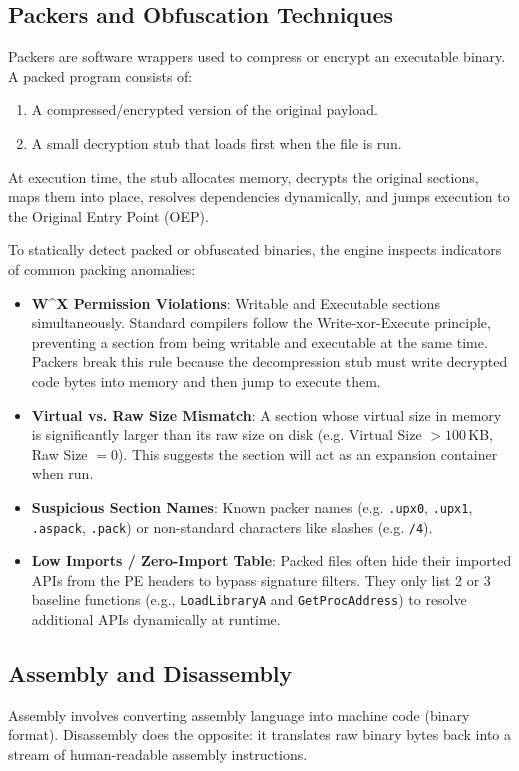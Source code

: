 \documentclass[11pt,a4paper]{article}
\begin{document}
\subsection{Packers and Obfuscation Techniques}
Packers are software wrappers used to compress or encrypt an executable binary. A packed program consists of:
\begin{enumerate}
    \item A compressed/encrypted version of the original payload.
    \item A small decryption stub that loads first when the file is run.
\end{enumerate}
At execution time, the stub allocates memory, decrypts the original sections, maps them into place, resolves dependencies dynamically, and jumps execution to the Original Entry Point (OEP).

To statically detect packed or obfuscated binaries, the engine inspects indicators of common packing anomalies:
\begin{itemize}
    \item \textbf{W\textasciicircum{}X Permission Violations}: Writable and Executable sections simultaneously. Standard compilers follow the Write-xor-Execute principle, preventing a section from being writable and executable at the same time. Packers break this rule because the decompression stub must write decrypted code bytes into memory and then jump to execute them.
    \item \textbf{Virtual vs. Raw Size Mismatch}: A section whose virtual size in memory is significantly larger than its raw size on disk (e.g. Virtual Size $> 100$\,KB, Raw Size $= 0$). This suggests the section will act as an expansion container when run.
    \item \textbf{Suspicious Section Names}: Known packer names (e.g. \texttt{.upx0}, \texttt{.upx1}, \texttt{.aspack}, \texttt{.pack}) or non-standard characters like slashes (e.g. \texttt{/4}).
    \item \textbf{Low Imports / Zero-Import Table}: Packed files often hide their imported APIs from the PE headers to bypass signature filters. They only list 2 or 3 baseline functions (e.g., \texttt{LoadLibraryA} and \texttt{GetProcAddress}) to resolve additional APIs dynamically at runtime.
\end{itemize}

\subsection{Assembly and Disassembly}
Assembly involves converting assembly language into machine code (binary format). Disassembly does the opposite: it translates raw binary bytes back into a stream of human-readable assembly instructions. 
\end{document}
